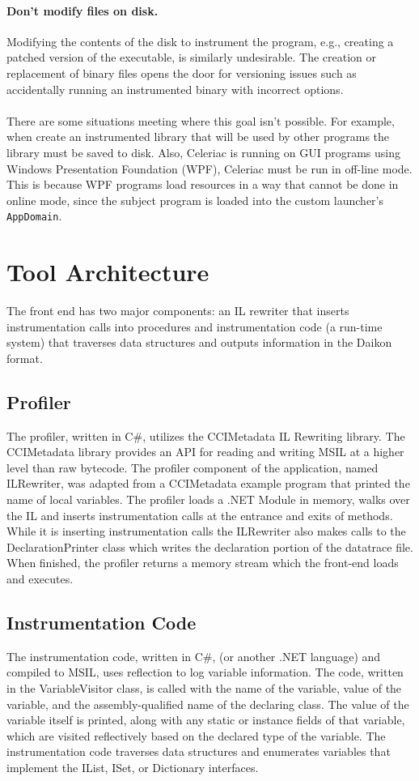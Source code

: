\documentclass{article}
\begin{document}
\paragraph{Don't modify files on disk.}
Modifying the contents of the disk to instrument the program, e.g., creating a patched version of the executable, is similarly undesirable. The creation or replacement of binary files opens the door for versioning issues such as accidentally running an instrumented binary with incorrect options. 
\\ \\
There are some situations meeting where this goal isn't possible. For example, when create an instrumented library that will be used by other programs the library must be saved to disk. Also, Celeriac is running on GUI programs using Windows Presentation Foundation (WPF), Celeriac must be run in off-line mode. This is because WPF programs load resources in a way that cannot be done in online mode, since the subject program is loaded into the custom launcher's \texttt{AppDomain}.

\section{Tool Architecture}
The front end has two major components: an IL rewriter that inserts instrumentation calls into procedures and instrumentation code (a run-time system) that traverses data structures and outputs information in the Daikon format.

\subsection{Profiler}
The profiler, written in C\#, utilizes the CCIMetadata IL Rewriting library. The CCIMetadata library provides an API for reading and writing MSIL at a higher level than raw bytecode. The profiler component of the application, named ILRewriter, was adapted from a CCIMetadata example program that printed the name of local variables. The profiler loads a .NET Module in memory, walks over the IL and inserts instrumentation calls at the entrance and exits of methods. While it is inserting instrumentation calls the ILRewriter also makes calls to the DeclarationPrinter class which writes the declaration portion of the datatrace file. When finished, the profiler returns a memory stream which the front-end loads and executes.

\subsection{Instrumentation Code}
The instrumentation code, written in C\#, (or another .NET language) and compiled to MSIL, uses reflection to log variable information. The code, written in the VariableVisitor class, is called with the name of the variable, value of the variable, and the assembly-qualified name of the declaring class. The value of the variable itself is printed, along with any static or instance fields of that variable, which are visited reflectively based on the declared type of the variable. The instrumentation code traverses data structures and enumerates variables that implement the IList, ISet, or Dictionary interfaces.
\end{document}
